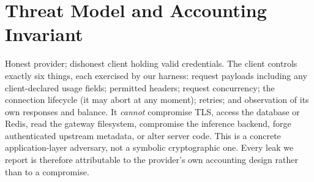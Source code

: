 \documentclass[11pt]{article}
\begin{document}
\begin{table}[t]\centering
\caption{Adversary directions in LLM inference accounting. Prior work covers the first
three; this paper studies the fourth.}
\label{tab:quadrant}
\end{table}

\section{Threat Model and Accounting Invariant}
\label{sec:threat}
Honest provider; dishonest client holding valid credentials. The client controls exactly
six things, each exercised by our harness: request payloads including any client-declared
usage fields; permitted headers; request concurrency; the connection lifecycle (it may
abort at any moment); retries; and observation of its own responses and balance. It
\emph{cannot} compromise TLS, access the database or Redis, read the gateway filesystem,
compromise the inference backend, forge authenticated upstream metadata, or alter server
code. This is a concrete application-layer adversary, not a symbolic cryptographic one.
Every leak we report is therefore attributable to the provider's own accounting design
rather than to a compromise.
\end{document}
